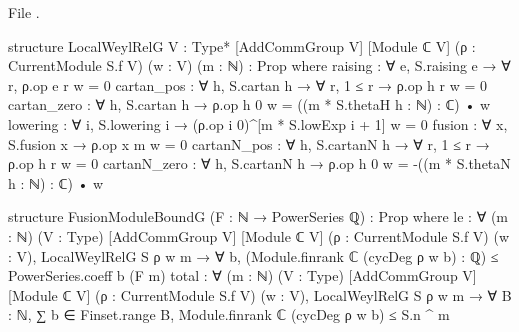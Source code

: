 \noindent File .
\begin{leancode}
structure LocalWeylRelG {V : Type*} [AddCommGroup V] [Module ℂ V]
    (ρ : CurrentModule S.f V) (w : V) (m : ℕ) : Prop where
  raising : ∀ e, S.raising e → ∀ r, ρ.op e r w = 0
  cartan_pos : ∀ h, S.cartan h → ∀ r, 1 ≤ r → ρ.op h r w = 0
  cartan_zero : ∀ h, S.cartan h → ρ.op h 0 w = ((m * S.thetaH h : ℕ) : ℂ) • w
  lowering : ∀ i, S.lowering i → (ρ.op i 0)^[m * S.lowExp i + 1] w = 0
  fusion : ∀ x, S.fusion x → ρ.op x m w = 0
  cartanN_pos : ∀ h, S.cartanN h → ∀ r, 1 ≤ r → ρ.op h r w = 0
  cartanN_zero : ∀ h, S.cartanN h → ρ.op h 0 w = -((m * S.thetaN h : ℕ) : ℂ) • w

structure FusionModuleBoundG (F : ℕ → PowerSeries ℚ) : Prop where
  le : ∀ (m : ℕ) (V : Type) [AddCommGroup V] [Module ℂ V] (ρ : CurrentModule S.f V) (w : V),
    LocalWeylRelG S ρ w m → ∀ b, (Module.finrank ℂ (cycDeg ρ w b) : ℚ) ≤ PowerSeries.coeff b (F m)
  total : ∀ (m : ℕ) (V : Type) [AddCommGroup V] [Module ℂ V] (ρ : CurrentModule S.f V) (w : V),
    LocalWeylRelG S ρ w m → ∀ B : ℕ,
      ∑ b ∈ Finset.range B, Module.finrank ℂ (cycDeg ρ w b) ≤ S.n ^ m
\end{leancode}

